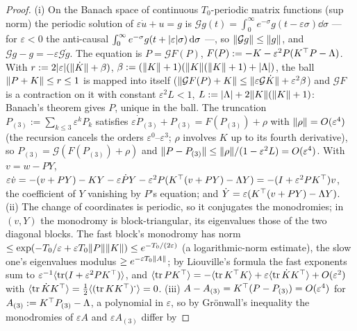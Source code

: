 \begin{proof}
(i) On the Banach space of continuous $T_0$-periodic matrix functions (sup norm) the periodic solution of
$\varepsilon\dot u + u = g$ is $\mathcal{G}g(t) = \int_0^\infty e^{-\sigma}g(t - \varepsilon\sigma)\dd\sigma$ --- for
$\varepsilon < 0$ the anti-causal $\int_0^\infty e^{-\sigma}g(t + \lvert \varepsilon\rvert\sigma)\,\mathrm{d}\sigma$ ---, so
$\lVert \mathcal{G}g\rVert\le\lVert g\rVert$, and $\mathcal{G}g - g = -\varepsilon\mathcal{G}\dot g$. The equation is
$P = \mathcal{G}F(P)$, $F(P) := -K - \varepsilon^2P(K^\top P - \Lambda)$. With
$r := 2\lvert \varepsilon\rvert(\lVert \dot K\rVert + \beta)$, $\beta := (\lVert K\rVert + 1)(\lVert K\rVert(\lVert K\rVert + 1) + \lvert \Lambda\rvert)$,
the ball $\lVert P + K\rVert\le r\le1$ is mapped into itself
($\lVert \mathcal{G}F(P) + K\rVert\le\lVert \varepsilon\mathcal{G}\dot K\rVert + \varepsilon^2\beta$) and $\mathcal{G}F$ is a
contraction on it with constant $\varepsilon^2L < 1$, $L := \lvert \Lambda\rvert + 2\lVert K\rVert(\lVert K\rVert + 1)$: Banach's theorem gives
$P$, unique in the ball. The truncation $P_{(3)} := \sum_{k\le3}\varepsilon^kP_k$ satisfies
$\varepsilon\dot P_{(3)} + P_{(3)} = F(P_{(3)}) + \rho$ with $\lVert \rho\rVert = O(\varepsilon^4)$ (the recursion cancels
the orders $\varepsilon^0$--$\varepsilon^3$; $\rho$ involves $K$ up to its fourth derivative), so
$P_{(3)} = \mathcal{G}(F(P_{(3)}) + \rho)$ and
$\lVert P - P_{(3)}\rVert\le\lVert \rho\rVert/(1 - \varepsilon^2L) = O(\varepsilon^4)$. With $v = w - PY$,
$\varepsilon\dot v = -(v + PY) - KY - \varepsilon\dot PY - \varepsilon^2P(K^\top(v + PY) - \Lambda Y)
= -(I + \varepsilon^2PK^\top)v$, the coefficient of $Y$ vanishing by $P$'s equation; and
$\dot Y = \varepsilon(K^\top(v + PY) - \Lambda Y)$. (ii) The change of coordinates is periodic, so it conjugates the
monodromies; in $(v,Y)$ the monodromy is block-triangular, its eigenvalues those of the two diagonal blocks. The fast
block's monodromy has norm
$\le\exp(-T_0/\varepsilon + \varepsilon T_0\lVert P\rVert\lVert K\rVert)\le e^{-T_0/(2\varepsilon)}$ (a logarithmic-norm
estimate), the slow one's eigenvalues modulus $\ge e^{-\varepsilon T_0\lVert A\rVert}$; by Liouville's formula the fast
exponents sum to $\varepsilon^{-1}\langle\operatorname{tr}(I + \varepsilon^2PK^\top)\rangle$, and
$\langle\operatorname{tr} PK^\top\rangle = -\langle\operatorname{tr} K^\top K\rangle + \varepsilon\langle\operatorname{tr}\dot KK^\top\rangle + O(\varepsilon^2)$
with $\langle\operatorname{tr}\dot KK^\top\rangle = \frac12\langle(\operatorname{tr} KK^\top)^{\boldsymbol\cdot}\rangle = 0$. (iii)
$A - A_{(3)} = K^\top(P - P_{(3)}) = O(\varepsilon^4)$ for $A_{(3)} := K^\top P_{(3)} - \Lambda$, a polynomial in
$\varepsilon$, so by Gr\"onwall's inequality the monodromies of $\varepsilon A$ and $\varepsilon A_{(3)}$ differ by

\end{proof}

